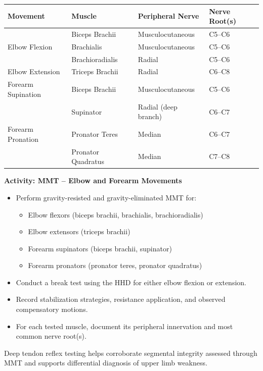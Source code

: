 \begin{tabular}{|p{4cm}|p{4.5cm}|p{4cm}|p{2.5cm}|}
\hline
\textbf{Movement} & \textbf{Muscle} & \textbf{Peripheral Nerve} & \textbf{Nerve Root(s)} \\
\hline
\multirow{3}{*}{Elbow Flexion}
  & Biceps Brachii & Musculocutaneous & C5–C6 \\
  & Brachialis & Musculocutaneous & C5–C6 \\
  & Brachioradialis & Radial & C5–C6 \\
\hline
Elbow Extension
  & Triceps Brachii & Radial & C6–C8 \\
\hline
Forearm Supination
  & Biceps Brachii & Musculocutaneous & C5–C6 \\
  & Supinator & Radial (deep branch) & C6–C7 \\
\hline
Forearm Pronation
  & Pronator Teres & Median & C6–C7 \\
  & Pronator Quadratus & Median  & C7–C8 \\
\hline
\end{tabular}

\begin{labactivitybox}
\textbf{Activity: MMT – Elbow and Forearm Movements}

\begin{itemize}
  \item Perform gravity-resisted and gravity-eliminated MMT for:
  \begin{itemize}
    \item Elbow flexors (biceps brachii, brachialis, brachioradialis)
    \item Elbow extensors (triceps brachii)
    \item Forearm supinators (biceps brachii, supinator)
    \item Forearm pronators (pronator teres, pronator quadratus)
  \end{itemize}
  \item Conduct a break test using the HHD for either elbow flexion or extension.
  \item Record stabilization strategies, resistance application, and observed compensatory motions.
  \item For each tested muscle, document its peripheral innervation and most common nerve root(s).
\end{itemize}
\end{labactivitybox}

\noindent Deep tendon reflex testing helps corroborate segmental integrity assessed through MMT and supports differential diagnosis of upper limb weakness.


